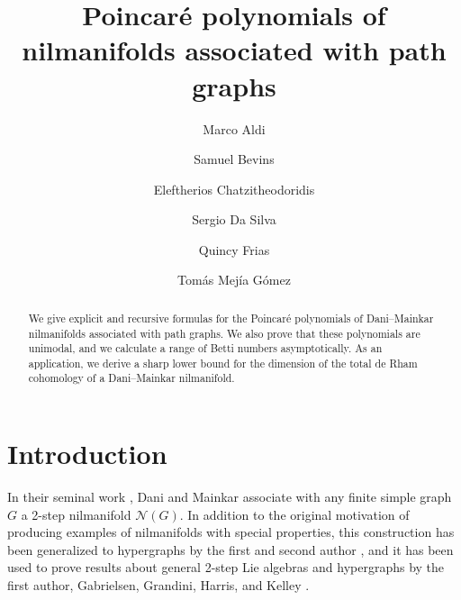 \documentclass[12pt]{amsart}
\theoremstyle{definition}
\begin{document}
\title{Poincar\'e polynomials of nilmanifolds associated with path graphs}
\author[Aldi]{Marco Aldi}
\author[Bevins]{Samuel Bevins}
\author[Chatzitheodoridis]{Eleftherios Chatzitheodoridis}
\author[Da Silva]{Sergio Da Silva}
\author[Frias]{Quincy Frias}
\author[Mej{\'i}a G{\'o}mez]{Tom\'as Mej{\'i}a G{\'o}mez}
\address[Aldi]{Department of Mathematics and Statistics, Virginia Commonwealth University, Grace E. Harris Hall, 1015 Floyd Ave., Richmond, VA 23284, USA}
\address[Bevins]{Department of Physics, William \& Mary, Small Hall, 300 Ukrop Way, Williamsburg, VA 23185, USA}
\address[Chatzitheodoridis]{Department of Mathematics and Statistics, Virginia Commonwealth University, Grace E. Harris Hall, 1015 Floyd Ave., Richmond, VA 23284, USA}
\address[Da Silva]{
    Department of Mathematics and Economics, 
    Virginia State University, 
    1 Hayden Dr.,
    Petersburg, VA 23806, USA}
\address[Frias]{Department of Mathematical Sciences, George Mason University, Exploratory Hall, 4400 University Dr., Fairfax, VA 22030, USA}
\address[Mej{\'i}a G{\'o}mez]{
    Fakultät für Mathematik, Ruhr-Universität Bochum, Universitätsstraße 150, 44780 Bochum, Germany
}

\begin{abstract}
We give explicit and recursive formulas for the Poincar\'e polynomials of Dani--Mainkar nilmanifolds associated with path graphs. We also prove that these polynomials are unimodal, and we calculate a range of Betti numbers asymptotically. As an application, we derive a sharp lower bound for the dimension of the total de Rham cohomology of a Dani--Mainkar nilmanifold.
\end{abstract}
\maketitle

\section{Introduction}\label{sec:1}

In their seminal work \cite{DaniMainkar05}, Dani and Mainkar associate with any finite simple graph $G$ a 2-step nilmanifold $\mathcal N(G)$. In addition to the original motivation of producing examples of nilmanifolds with special properties, this construction has been generalized to hypergraphs by the first and second author \cite{AldiBevins24}, and it has been used to prove results about general 2-step Lie algebras and hypergraphs by the first author, Gabrielsen, Grandini, Harris, and Kelley \cite{AGGHK, AGGHK2}.
\end{document}
